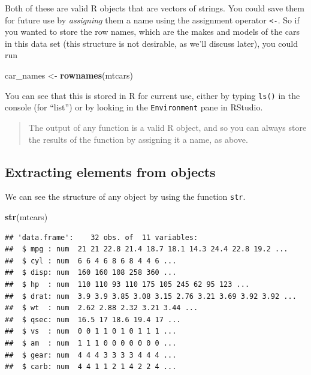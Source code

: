 \documentclass[12pt,letterpaperpaper,openany]{book}
\newenvironment{Shaded}{\begin{snugshade}}{\end{snugshade}}
\newcommand{\KeywordTok}[1]{\textcolor[rgb]{0.13,0.29,0.53}{\textbf{#1}}}
\newcommand{\NormalTok}[1]{#1}
\newcommand{\StringTok}[1]{\textcolor[rgb]{0.31,0.60,0.02}{#1}}
\begin{document}
Both of these are valid R objects that are vectors of strings. You could save them for future use by \emph{assigning} them a name using the assignment operator \texttt{\textless{}-}. So if you wanted to store the row names, which are the makes and models of the cars in this data set (this structure is not desirable, as we'll discuss later), you could run

\begin{Shaded}
\begin{Highlighting}[]
\NormalTok{car_names <-}\StringTok{ }\KeywordTok{rownames}\NormalTok{(mtcars)}
\end{Highlighting}
\end{Shaded}

You can see that this is stored in R for current use, either by typing \texttt{ls()} in the console (for ``list'') or by looking in the \texttt{Environment} pane in RStudio.

\begin{quote}
The output of any function is a valid R object, and so you can always store the results of the
function by assigning it a name, as above.
\end{quote}

\hypertarget{extracting-elements-from-objects}{%
\subsection{Extracting elements from objects}\label{extracting-elements-from-objects}}

We can see the structure of any object by using the function \texttt{str}.

\begin{Shaded}
\begin{Highlighting}[]
\KeywordTok{str}\NormalTok{(mtcars)}
\end{Highlighting}
\end{Shaded}

\begin{verbatim}
## 'data.frame':    32 obs. of  11 variables:
##  $ mpg : num  21 21 22.8 21.4 18.7 18.1 14.3 24.4 22.8 19.2 ...
##  $ cyl : num  6 6 4 6 8 6 8 4 4 6 ...
##  $ disp: num  160 160 108 258 360 ...
##  $ hp  : num  110 110 93 110 175 105 245 62 95 123 ...
##  $ drat: num  3.9 3.9 3.85 3.08 3.15 2.76 3.21 3.69 3.92 3.92 ...
##  $ wt  : num  2.62 2.88 2.32 3.21 3.44 ...
##  $ qsec: num  16.5 17 18.6 19.4 17 ...
##  $ vs  : num  0 0 1 1 0 1 0 1 1 1 ...
##  $ am  : num  1 1 1 0 0 0 0 0 0 0 ...
##  $ gear: num  4 4 4 3 3 3 3 4 4 4 ...
##  $ carb: num  4 4 1 1 2 1 4 2 2 4 ...
\end{verbatim}
\end{document}
